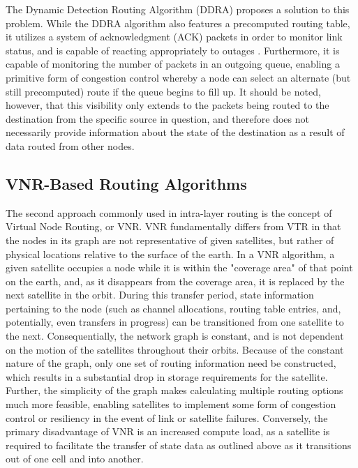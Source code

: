 The Dynamic Detection Routing Algorithm (DDRA) proposes a solution to this problem. While the DDRA algorithm also features a precomputed routing table, it utilizes a system of acknowledgment (ACK) packets in order to monitor link status, and is capable of reacting appropriately to outages \cite{tan_novel_2014}. Furthermore, it is capable of monitoring the number of packets in an outgoing queue, enabling a primitive form of congestion control whereby a node can select an alternate (but still precomputed) route if the queue begins to fill up. It should be noted, however, that this visibility only extends to the packets being routed to the destination from the specific source in question, and therefore does not necessarily provide information about the state of the destination as a result of data routed from other nodes. 

\subsection{VNR-Based Routing Algorithms}\label{subsec:vnr}
The second approach commonly used in intra-layer routing is the concept of Virtual Node Routing, or VNR. VNR fundamentally differs from VTR in that the nodes in its graph are not representative of given satellites, but rather of physical locations relative to the surface of the earth. In a VNR algorithm, a given satellite occupies a node while it is within the "coverage area" of that point on the earth, and, as it disappears from the coverage area, it is replaced by the next satellite in the orbit. During this transfer period, state information pertaining to the node (such as channel allocations, routing table entries, and, potentially, even transfers in progress) can be transitioned from one satellite to the next. Consequentially, the network graph is constant, and is not dependent on the motion of the satellites throughout their orbits. Because of the constant nature of the graph, only one set of routing information need be constructed, which results in a substantial drop in storage requirements for the satellite. Further, the simplicity of the graph makes calculating multiple routing options much more feasible, enabling satellites to implement some form of congestion control or resiliency in the event of link or satellite failures. Conversely, the primary disadvantage of VNR is an increased compute load, as a satellite is required to facilitate the transfer of state data as outlined above as it transitions out of one cell and into another.

